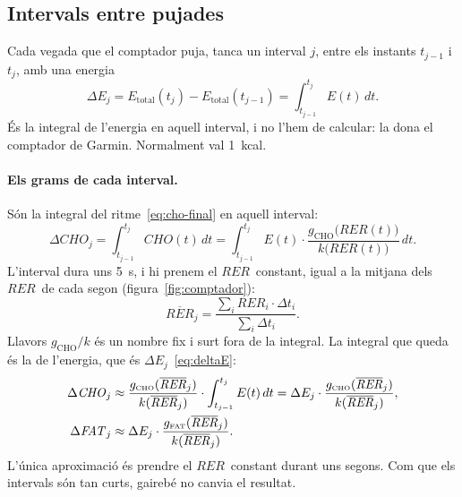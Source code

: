 \documentclass[10pt,a4paper]{article}
\newcommand{\sub}[1]{{\scriptscriptstyle\mathrm{#1}}}   %
\newcommand{\CHO}{\sub{CHO}}
\newcommand{\FAT}{\sub{FAT}}
\newcommand{\tot}{\sub{total}}
\newcommand{\cho}{\ensuremath{\mathit{CHO}}}               %
\newcommand{\fat}{\ensuremath{\mathit{FAT}}}
\newcommand{\RER}{\ensuremath{\mathit{RER}}}
\newcommand{\RERi}{\ensuremath{\overline{\mathit{RER}}}}
\begin{document}
\subsection{Intervals entre pujades}
Cada vegada que el comptador puja, tanca un interval $j$, entre els instants $t_{j-1}$ i
$t_j$, amb una energia
\begin{equation}
  \Delta E_j=E_{\tot}(t_j)-E_{\tot}(t_{j-1})=\int_{t_{j-1}}^{t_j}E(t)\,dt .
  \label{eq:deltaE}
\end{equation}
És la integral de l'energia en aquell interval, i no l'hem de calcular: la dona el comptador
de Garmin. Normalment val 1~kcal.

\paragraph{Els grams de cada interval.} Són la integral del ritme~\eqref{eq:cho-final} en
aquell interval:
\[
  \Delta\cho_j=\int_{t_{j-1}}^{t_j}\cho(t)\,dt
  =\int_{t_{j-1}}^{t_j}E(t)\cdot\frac{g_{\CHO}\bigl(\RER(t)\bigr)}{k\bigl(\RER(t)\bigr)}\,dt .
\]
L'interval dura uns 5~s, i hi prenem el \RER\ constant, igual a la mitjana dels \RER\ de cada
segon (figura~\ref{fig:comptador}):
\[
  \RERi_j=\frac{\sum_i\RER_i\cdot\Delta t_i}{\sum_i\Delta t_i} .
\]
Llavors $g_{\CHO}/k$ és un nombre fix i surt fora de la integral. La integral que queda és la
de l'energia, que és $\Delta E_j$~\eqref{eq:deltaE}:
\begin{align}
  \Delta\cho_j &\approx\frac{g_{\CHO}(\RERi_j)}{k(\RERi_j)}\cdot\int_{t_{j-1}}^{t_j}E(t)\,dt
  =\Delta E_j\cdot\frac{g_{\CHO}(\RERi_j)}{k(\RERi_j)}, \label{eq:interval}\\
  \Delta\fat_j &\approx\Delta E_j\cdot\frac{g_{\FAT}(\RERi_j)}{k(\RERi_j)} . \notag
\end{align}
L'única aproximació és prendre el \RER\ constant durant uns segons. Com que els intervals són
tan curts, gairebé no canvia el resultat.
\end{document}
